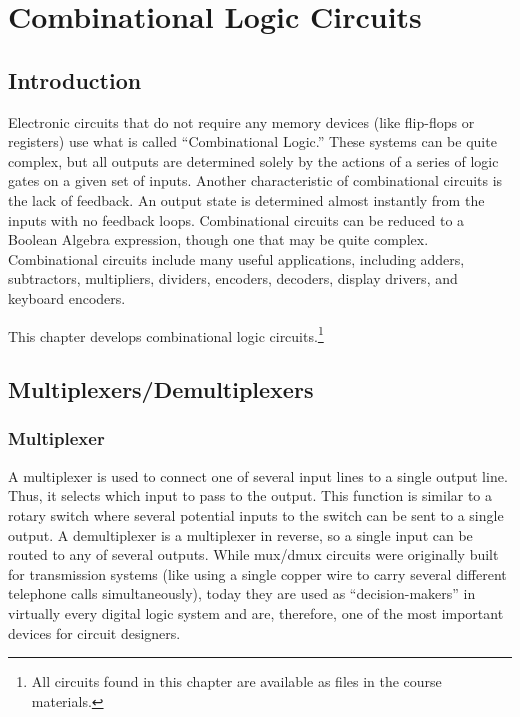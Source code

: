 \chapter{Combinational Logic Circuits}\label{ch08}
\section{Introduction}

Electronic circuits that do not require any memory devices (like flip-flops or registers) use what is called ``Combinational Logic.'' These systems can be quite complex, but all outputs are determined solely by the actions of a series of logic gates on a given set of inputs. Another characteristic of combinational circuits is the lack of feedback. An output state is determined almost instantly from the inputs with no feedback loops. Combinational circuits can be reduced to a Boolean Algebra expression, though one that may be quite complex. Combinational circuits include many useful applications, including adders, subtractors, multipliers, dividers, encoders, decoders, display drivers, and keyboard encoders.
 
This chapter develops combinational logic circuits.\footnote{All circuits found in this chapter are available as \Le files in the course materials.}

\section{Multiplexers/Demultiplexers}
\label{CL:sec:multiplexers_demultiplexers}

\subsection{Multiplexer}
\label{CL:subsec:multiplexer}


A multiplexer is used to connect one of several input lines to a single output line. Thus, it selects which input to pass to the output. This function is similar to a rotary switch where several potential inputs to the switch can be sent to a single output. A demultiplexer is a multiplexer in reverse, so a single input can be routed to any of several outputs. While mux/dmux circuits were originally built for transmission systems (like using a single copper wire to carry several different telephone calls simultaneously), today they are used as ``decision-makers'' in virtually every digital logic system and are, therefore, one of the most important devices for circuit designers. 


